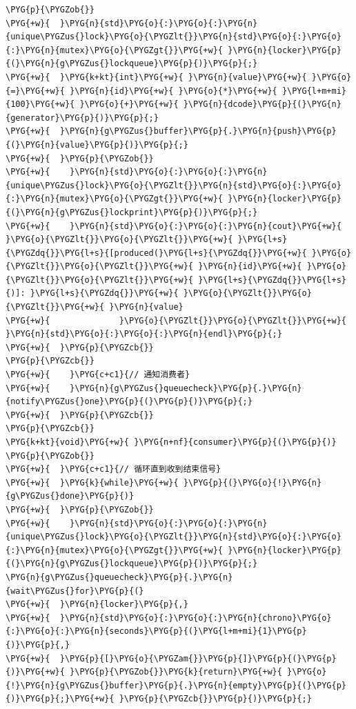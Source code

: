 \begin{codeblockbg}
\begin{Verbatim}[commandchars=\\\{\},breaklines=true,breakanywhere=true,fontsize=\codefont,xleftmargin=17bp]
\PYG{p}{\PYGZob{}}
\PYG{+w}{  }\PYG{n}{std}\PYG{o}{:}\PYG{o}{:}\PYG{n}{unique\PYGZus{}lock}\PYG{o}{\PYGZlt{}}\PYG{n}{std}\PYG{o}{:}\PYG{o}{:}\PYG{n}{mutex}\PYG{o}{\PYGZgt{}}\PYG{+w}{ }\PYG{n}{locker}\PYG{p}{(}\PYG{n}{g\PYGZus{}lockqueue}\PYG{p}{)}\PYG{p}{;}
\PYG{+w}{  }\PYG{k+kt}{int}\PYG{+w}{ }\PYG{n}{value}\PYG{+w}{ }\PYG{o}{=}\PYG{+w}{ }\PYG{n}{id}\PYG{+w}{ }\PYG{o}{*}\PYG{+w}{ }\PYG{l+m+mi}{100}\PYG{+w}{ }\PYG{o}{+}\PYG{+w}{ }\PYG{n}{dcode}\PYG{p}{(}\PYG{n}{generator}\PYG{p}{)}\PYG{p}{;}
\PYG{+w}{  }\PYG{n}{g\PYGZus{}buffer}\PYG{p}{.}\PYG{n}{push}\PYG{p}{(}\PYG{n}{value}\PYG{p}{)}\PYG{p}{;}
\PYG{+w}{  }\PYG{p}{\PYGZob{}}
\PYG{+w}{    }\PYG{n}{std}\PYG{o}{:}\PYG{o}{:}\PYG{n}{unique\PYGZus{}lock}\PYG{o}{\PYGZlt{}}\PYG{n}{std}\PYG{o}{:}\PYG{o}{:}\PYG{n}{mutex}\PYG{o}{\PYGZgt{}}\PYG{+w}{ }\PYG{n}{locker}\PYG{p}{(}\PYG{n}{g\PYGZus{}lockprint}\PYG{p}{)}\PYG{p}{;}
\PYG{+w}{    }\PYG{n}{std}\PYG{o}{:}\PYG{o}{:}\PYG{n}{cout}\PYG{+w}{ }\PYG{o}{\PYGZlt{}}\PYG{o}{\PYGZlt{}}\PYG{+w}{ }\PYG{l+s}{\PYGZdq{}}\PYG{l+s}{[produced(}\PYG{l+s}{\PYGZdq{}}\PYG{+w}{ }\PYG{o}{\PYGZlt{}}\PYG{o}{\PYGZlt{}}\PYG{+w}{ }\PYG{n}{id}\PYG{+w}{ }\PYG{o}{\PYGZlt{}}\PYG{o}{\PYGZlt{}}\PYG{+w}{ }\PYG{l+s}{\PYGZdq{}}\PYG{l+s}{)]: }\PYG{l+s}{\PYGZdq{}}\PYG{+w}{ }\PYG{o}{\PYGZlt{}}\PYG{o}{\PYGZlt{}}\PYG{+w}{ }\PYG{n}{value}
\PYG{+w}{              }\PYG{o}{\PYGZlt{}}\PYG{o}{\PYGZlt{}}\PYG{+w}{ }\PYG{n}{std}\PYG{o}{:}\PYG{o}{:}\PYG{n}{endl}\PYG{p}{;}
\PYG{+w}{  }\PYG{p}{\PYGZcb{}}
\PYG{p}{\PYGZcb{}}
\PYG{+w}{    }\PYG{c+c1}{// 通知消费者}
\PYG{+w}{    }\PYG{n}{g\PYGZus{}queuecheck}\PYG{p}{.}\PYG{n}{notify\PYGZus{}one}\PYG{p}{(}\PYG{p}{)}\PYG{p}{;}
\PYG{+w}{  }\PYG{p}{\PYGZcb{}}
\PYG{p}{\PYGZcb{}}
\PYG{k+kt}{void}\PYG{+w}{ }\PYG{n+nf}{consumer}\PYG{p}{(}\PYG{p}{)}
\PYG{p}{\PYGZob{}}
\PYG{+w}{  }\PYG{c+c1}{// 循环直到收到结束信号}
\PYG{+w}{  }\PYG{k}{while}\PYG{+w}{ }\PYG{p}{(}\PYG{o}{!}\PYG{n}{g\PYGZus{}done}\PYG{p}{)}
\PYG{+w}{  }\PYG{p}{\PYGZob{}}
\PYG{+w}{    }\PYG{n}{std}\PYG{o}{:}\PYG{o}{:}\PYG{n}{unique\PYGZus{}lock}\PYG{o}{\PYGZlt{}}\PYG{n}{std}\PYG{o}{:}\PYG{o}{:}\PYG{n}{mutex}\PYG{o}{\PYGZgt{}}\PYG{+w}{ }\PYG{n}{locker}\PYG{p}{(}\PYG{n}{g\PYGZus{}lockqueue}\PYG{p}{)}\PYG{p}{;}
\PYG{n}{g\PYGZus{}queuecheck}\PYG{p}{.}\PYG{n}{wait\PYGZus{}for}\PYG{p}{(}
\PYG{+w}{  }\PYG{n}{locker}\PYG{p}{,}
\PYG{+w}{  }\PYG{n}{std}\PYG{o}{:}\PYG{o}{:}\PYG{n}{chrono}\PYG{o}{:}\PYG{o}{:}\PYG{n}{seconds}\PYG{p}{(}\PYG{l+m+mi}{1}\PYG{p}{)}\PYG{p}{,}
\PYG{+w}{  }\PYG{p}{[}\PYG{o}{\PYGZam{}}\PYG{p}{]}\PYG{p}{(}\PYG{p}{)}\PYG{+w}{ }\PYG{p}{\PYGZob{}}\PYG{k}{return}\PYG{+w}{ }\PYG{o}{!}\PYG{n}{g\PYGZus{}buffer}\PYG{p}{.}\PYG{n}{empty}\PYG{p}{(}\PYG{p}{)}\PYG{p}{;}\PYG{+w}{ }\PYG{p}{\PYGZcb{}}\PYG{p}{)}\PYG{p}{;}

\end{Verbatim}
\end{codeblockbg}
